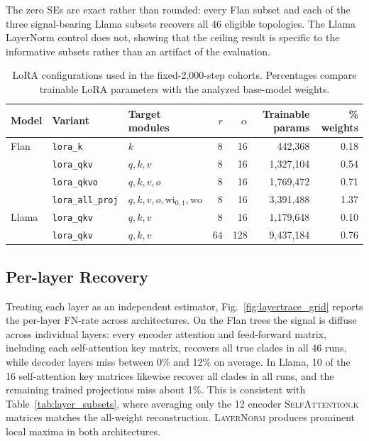 \documentclass{article}
\theoremstyle{definition}
\theoremstyle{plain}
\begin{document}
The zero SEs are exact rather than rounded: every Flan subset and each of the three signal-bearing
Llama subsets recovers all 46 eligible topologies. The Llama LayerNorm control does not, showing that
the ceiling result is specific to the informative subsets rather than an artifact of the evaluation.

\begin{table}[h]
\caption{LoRA configurations used in the fixed-2,000-step cohorts. Percentages compare trainable
LoRA parameters with the analyzed base-model weights.}
\label{tab:lora_variants}
\centering
\scriptsize
\begin{tabular}{lllrrrr}
\toprule
Model & Variant & Target modules & $r$ & $\alpha$ & Trainable params & \% weights \\
\midrule
Flan & \texttt{lora\_k}         & $k$                                      & 8  & 16  & 442,368   & 0.18 \\
     & \texttt{lora\_qkv}       & $q,k,v$                                  & 8  & 16  & 1,327,104 & 0.54 \\
     & \texttt{lora\_qkvo}      & $q,k,v,o$                                & 8  & 16  & 1,769,472 & 0.71 \\
     & \texttt{lora\_all\_proj} & $q,k,v,o,\mathrm{wi}_{0,1},\mathrm{wo}$ & 8  & 16  & 3,391,488 & 1.37 \\
\midrule
Llama & \texttt{lora\_qkv}      & $q,k,v$                                  & 8  & 16  & 1,179,648 & 0.10 \\
      & \texttt{lora\_qkv}      & $q,k,v$                                  & 64 & 128 & 9,437,184 & 0.76 \\
\bottomrule
\end{tabular}
\end{table}

\subsection*{Per-layer Recovery}
\label{app:layertrace}
Treating each layer as an independent estimator, Fig.~\ref{fig:layertrace_grid} reports the per-layer
FN-rate across architectures. On the Flan trees the signal is diffuse across individual layers:
every encoder attention and feed-forward matrix, including each self-attention key matrix, recovers all true clades in
all 46 runs, while decoder layers miss between 0\% and 12\% on average. In Llama, 10 of the 16
self-attention key matrices likewise recover all clades in all runs, and the remaining trained
projections miss about 1\%. This is consistent with Table~\ref{tab:layer_subsets}, where averaging
only the 12 encoder \textsc{SelfAttention.k} matrices matches the all-weight reconstruction. \textsc{LayerNorm} produces
prominent local maxima in both architectures.
\end{document}
